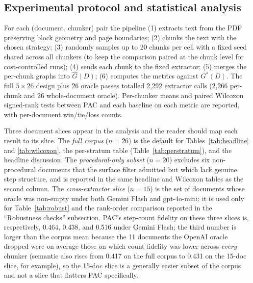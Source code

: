 \documentclass[make,article,submit,oneauthor,pdftex]{Definitions/mdpi}
\begin{document}
\subsection{Experimental protocol and statistical analysis}

For each (document, chunker) pair the pipeline (1) extracts text from
the PDF preserving block geometry and page boundaries; (2) chunks the
text with the chosen strategy; (3) randomly samples up to 20 chunks
per cell with a fixed seed shared across all chunkers (to keep the
comparison paired at the chunk level for cost-controlled runs);
(4) sends each chunk to the fixed extractor; (5) merges the per-chunk
graphs into $\hat{G}(D)$; (6) computes the metrics against
$G^{*}(D)$. The full $5\times26$ design plus 26 oracle passes
totalled 2{,}292 extractor calls (2{,}266 per-chunk and 26
whole-document oracle). Per-chunker means and paired Wilcoxon
signed-rank tests between PAC and each baseline on each metric are
reported, with per-document win/tie/loss counts.

Three document slices appear in the analysis and the reader should map
each result to its slice. The \emph{full corpus} ($n=26$) is the
default for Tables~\ref{tab:headline} and \ref{tab:wilcoxon}, the
per-stratum table (Table~\ref{tab:perstratum}), and the headline
discussion. The \emph{procedural-only subset} ($n=20$) excludes six
non-procedural documents that the surface filter admitted but which
lack genuine step structure, and is reported in the same headline and
Wilcoxon tables as the second column. The \emph{cross-extractor slice}
($n=15$) is the set of documents whose oracle was non-empty under both
Gemini Flash and gpt-4o-mini; it is used only for
Table~\ref{tab:robust} and the rank-order comparison reported in the
``Robustness checks'' subsection. PAC's step-count fidelity on these
three slices is, respectively, 0.464, 0.438, and 0.516 under Gemini
Flash; the third number is larger than the corpus mean because the
11 documents the OpenAI oracle dropped were on average those on
which count fidelity was lower across \emph{every} chunker (semantic
also rises from 0.417 on the full corpus to 0.431 on the 15-doc
slice, for example), so the 15-doc slice is a generally easier subset
of the corpus and not a slice that flatters PAC specifically.
\end{document}
